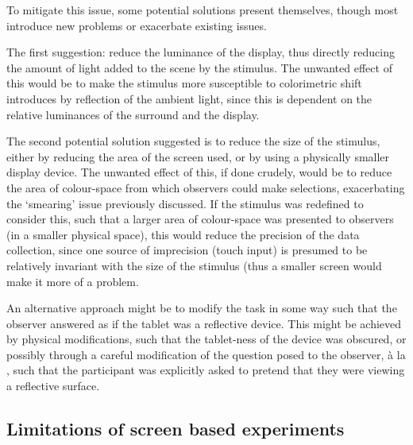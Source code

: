 

To mitigate this issue, some potential solutions present themselves, though most introduce new problems or exacerbate existing issues. 

The first suggestion: reduce the luminance of the display, thus directly reducing the amount of light added to the scene by the stimulus. The unwanted effect of this would be to make the stimulus more susceptible to colorimetric shift introduces by reflection of the ambient light, since this is dependent on the relative luminances of the surround and the display. 

The second potential solution suggested is to reduce the size of the stimulus, either by reducing the area of the screen used, or by using a physically smaller display device. The unwanted effect of this, if done crudely, would be to reduce the area of colour-space from which observers could make selections, exacerbating the `smearing' issue previously discussed. If the stimulus was redefined to consider this, such that a larger area of colour-space was presented to observers (in a smaller physical space), this would reduce the precision of the data collection, since one source of imprecision (touch input) is presumed to be relatively invariant with the size of the stimulus (thus a smaller screen would make it more of a problem.

An alternative approach might be to modify the task in some way such that the observer answered as if the tablet was a reflective device. This might be achieved by physical modifications, such that the tablet-ness of the device was obscured, or possibly through a careful modification of the question posed to the observer, à la \citet{arend_simultaneous_1986}, such that the participant was explicitly asked to pretend that they were viewing a reflective surface.

\subsection{Limitations of screen based experiments} \label{sec:bounding}

